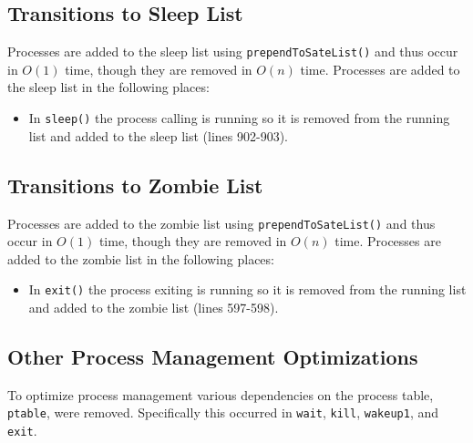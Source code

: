 \documentclass[11pt,letterpaper]{report}
\begin{document}
	\subsection*{Transitions to Sleep List}
	Processes are added to the sleep list using {\tt prependToSateList()} and thus occur in $O(1)$ time, though they are removed in $O(n)$ time. Processes are added to the sleep list in the following places:
		\begin{itemize}
			\item In {\tt sleep()} the process calling is running so it is removed from the running list and added to the sleep list (lines 902-903).
		\end{itemize}
		
	\subsection*{Transitions to Zombie List}
	Processes are added to the zombie list using {\tt prependToSateList()} and thus occur in $O(1)$ time, though they are removed in $O(n)$ time. Processes are added to the zombie list in the following places:
		\begin{itemize}
			\item In {\tt exit()} the process exiting is running so it is removed from the running list and added to the zombie list (lines 597-598).
		\end{itemize}
		
	\subsection*{Other Process Management Optimizations}
	To optimize process management various dependencies on the process table, {\tt ptable}, were removed. Specifically this occurred in {\tt wait}, {\tt kill}, {\tt wakeup1}, and {\tt exit}.
	
\end{document}
